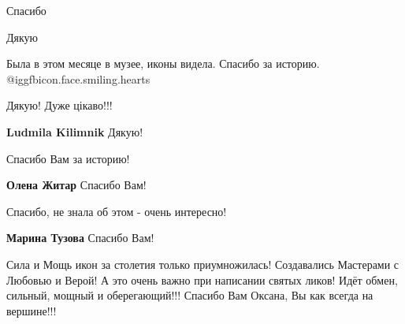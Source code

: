 \begin{itemize}
Спасибо

Дякую

Была в этом месяце в музее, иконы видела. Спасибо за историю. @igg{fbicon.face.smiling.hearts} 

Дякую! Дуже цікаво!!!

\textbf{Ludmila Kilimnik} Дякую!

Спасибо Вам за историю!

\textbf{Олена Житар} Спасибо Вам!

Спасибо, не знала об этом - очень интересно!

\textbf{Марина Тузова} Спасибо Вам!


Сила и Мощь икон за столетия только приумножилась! Создавались Мастерами с
Любовью и Верой! А это очень важно при написании святых ликов! Идёт обмен,
сильный, мощный и оберегающий!!! Спасибо Вам Оксана, Вы как всегда на
вершине!!!

\end{itemize} %
